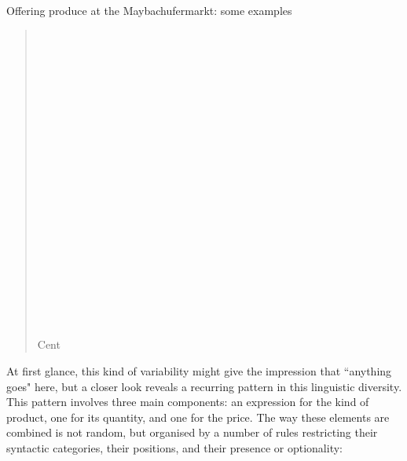  \ea
{\label{bkm:Ref121487920}Offering produce at the Maybachufermarkt: some examples}\\
\begin{quote}
    \\
    \\
    \\
    \\
    \\
    \\
    \\
    \\
    \\
    \\
    \\
    \\
    \\
    \\
    \\
    \\
    \\
    \\
    \\
    \\
      Cent
\end{quote} 
\z\clearpage

At first glance, this kind of variability might give the impression that “anything goes" here, but a closer look reveals a recurring pattern in this linguistic diversity. This pattern involves three main components: an expression for the kind of product, one for its quantity, and one for the price. The way these elements are combined is not random, but organised by a number of rules restricting their syntactic categories, their positions, and their presence or optionality:

